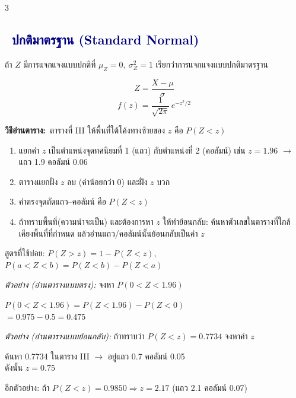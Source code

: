 \documentclass[9pt]{extarticle}
\newcommand{\dist}[1]{\subsection*{\textcolor{navy}{\textbullet\ #1}}}
\newcommand{\howto}{\textbf{\textcolor{navy!70!black}{วิธีอ่านตาราง:}}\ }
\begin{document}
\begin{multicols}{3}
\dist{ปกติมาตรฐาน (Standard Normal)}
ถ้า $Z$ มีการแจกแจงแบบปกติที่ $\mu_Z=0,\ \sigma_Z^2=1$ เรียกว่าการแจกแจงแบบปกติมาตรฐาน
\begin{formulabox}
$$Z=\dfrac{X-\mu}{\sigma}$$
$$f(z)=\dfrac{1}{\sqrt{2\pi}}\,e^{-z^2/2}$$
\end{formulabox}

\howto ตารางที่ III ให้พื้นที่ใต้โค้งทางซ้ายของ $z$ คือ $P(Z<z)$
\begin{enumerate}
\item แยกค่า $z$ เป็นตำแหน่งจุดทศนิยมที่ 1 (แถว) กับตำแหน่งที่ 2 (คอลัมน์) เช่น $z{=}1.96$ $\to$ แถว 1.9 คอลัมน์ 0.06
\item ตารางแยกฝั่ง $z$ ลบ (ค่าน้อยกว่า 0) และฝั่ง $z$ บวก
\item ค่าตรงจุดตัดแถว--คอลัมน์ คือ $P(Z{<}z)$
\item ถ้าทราบพื้นที่\allowbreak (ความน่าจะเป็น) และต้องการ\allowbreak หา $z$ ให้ทำย้อนกลับ: ค้นหา\allowbreak ตัวเลขในตาราง\allowbreak ที่ใกล้เคียง\allowbreak พื้นที่ที่กำหนด แล้วอ่าน\allowbreak แถว/คอลัมน์นั้น\allowbreak ย้อนกลับเป็นค่า $z$
\end{enumerate}
สูตรที่ใช้บ่อย: $P(Z{>}z)=1-P(Z{<}z)$, $P(a{<}Z{<}b)=P(Z{<}b)-P(Z{<}a)$

\textit{ตัวอย่าง (อ่านตารางแบบตรง):} จงหา $P(0<Z<1.96)$
\begin{solbox}
$P(0{<}Z{<}1.96)=P(Z{<}1.96)-P(Z{<}0)$\\
$=0.975-0.5=0.475$
\end{solbox}

\textit{ตัวอย่าง (อ่านตารางแบบย้อนกลับ):} ถ้าทราบว่า $P(Z<z)=0.7734$ จงหาค่า $z$
\begin{solbox}
ค้นหา 0.7734 ในตาราง III $\to$ อยู่แถว 0.7 คอลัมน์ 0.05\\
ดังนั้น $z=0.75$
\end{solbox}
อีกตัวอย่าง: ถ้า $P(Z<z)=0.9850 \Rightarrow z=2.17$ (แถว 2.1 คอลัมน์ 0.07)

\begin{center}
\vspace{-2pt}
\vspace{-4pt}
\end{center}


\end{multicols}
\end{document}
